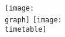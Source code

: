 \documentclass{article}
\begin{document}
	\begin{center}
		\texttt{[image: \\graph]}
		\newline
		\newline
		\texttt{[image: \\timetable]}
	\end{center}
\end{document}
